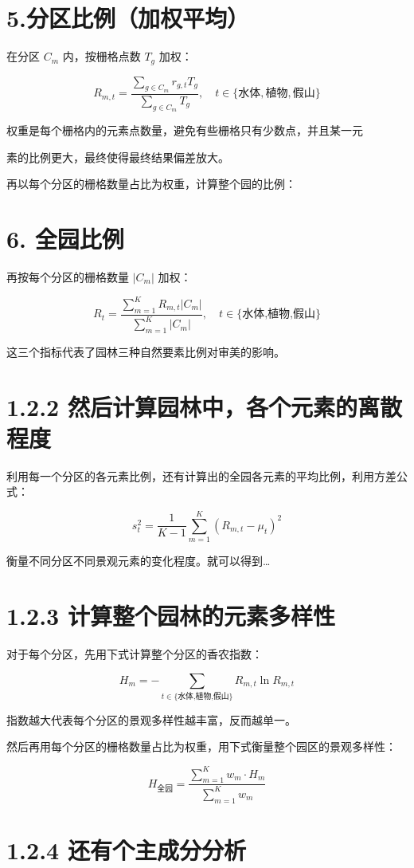 \section{5.分区比例（加权平均）}\label{ux5206ux533aux6bd4ux4f8bux52a0ux6743ux5e73ux5747}

在分区 \(C_m\) 内，按栅格点数 \(T_{g}\) 加权：

\[
R_{m,t} = \frac{\sum_{g\in C_m}r_{g,t}T_g}{\sum_{g\in C_m}T_g},\quad t\in \{水体,植物,假山\}
\]

权重是每个栅格内的元素点数量，避免有些栅格只有少数点，并且某一元

素的比例更大，最终使得最终结果偏差放大。

再以每个分区的栅格数量占比为权重，计算整个园的比例：

\section{6. 全园比例}\label{ux5168ux56edux6bd4ux4f8b}

再按每个分区的栅格数量 \(|C_{m}|\) 加权：

\[
R_{t} = \frac{\sum_{m = 1}^{K}R_{m,t}|C_{m}|}{\sum_{m = 1}^{K}|C_{m}|},\quad t\in \{\text{水体,植物,假山}\}
\]

这三个指标代表了园林三种自然要素比例对审美的影响。

\section{1.2.2
然后计算园林中，各个元素的离散程度}\label{ux7136ux540eux8ba1ux7b97ux56edux6797ux4e2dux5404ux4e2aux5143ux7d20ux7684ux79bbux6563ux7a0bux5ea6}

利用每一个分区的各元素比例，还有计算出的全园各元素的平均比例，利用方差公式：

\[
s_{t}^{2} = \frac{1}{K - 1}\sum_{m = 1}^{K}\left(R_{m,t} - \mu_{t}\right)^{2}
\]

衡量不同分区不同景观元素的变化程度。就可以得到\ldots{}

\section{1.2.3
计算整个园林的元素多样性}\label{ux8ba1ux7b97ux6574ux4e2aux56edux6797ux7684ux5143ux7d20ux591aux6837ux6027}

对于每个分区，先用下式计算整个分区的香农指数：

\[
H_{m} = -\sum_{t\in \{\text{水体,植物,假山}\}}R_{m,t}\ln R_{m,t}
\]

指数越大代表每个分区的景观多样性越丰富，反而越单一。

然后再用每个分区的栅格数量占比为权重，用下式衡量整个园区的景观多样性：

\[
H_{\text{全园}} = \frac{\sum_{m = 1}^{K}w_{m}\cdot H_{m}}{\sum_{m = 1}^{K}w_{m}}
\]

\section{1.2.4
还有个主成分分析}\label{ux8fd8ux6709ux4e2aux4e3bux6210ux5206ux5206ux6790}


